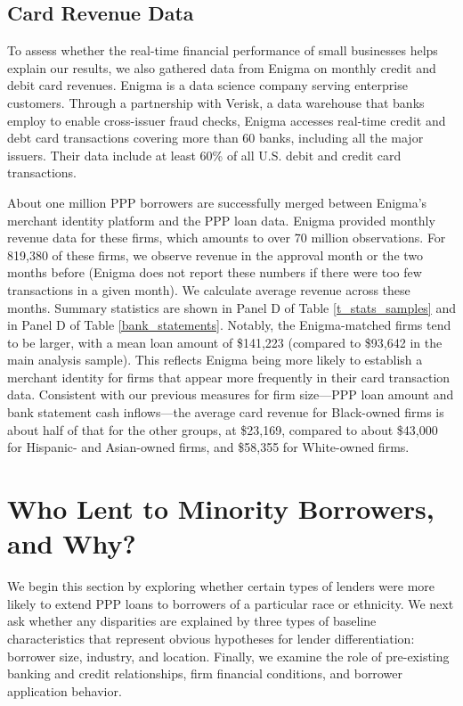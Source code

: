 \documentclass[11pt]{article}
\begin{document}
\subsection{Card Revenue Data}\label{data_card}

To assess whether the real-time financial performance of small businesses helps explain our results, we also gathered data from Enigma on monthly credit and debit card revenues. Enigma is a data science company serving enterprise customers. Through a partnership with Verisk, a data warehouse that banks employ to enable cross-issuer fraud checks, Enigma accesses real-time credit and debt card transactions covering more than 60 banks, including all the major issuers. Their data include at least 60\% of all U.S. debit and credit card transactions.

About one million PPP borrowers are successfully merged between Enigma's merchant identity platform and the PPP loan data. Enigma provided monthly revenue data for these firms, which amounts to over 70 million observations. For 819,380 of these firms, we observe revenue in the approval month or the two months before (Enigma does not report these numbers if there were too few transactions in a given month). We calculate average revenue across these months. Summary statistics are shown in  Panel D of Table \ref{t_stats_samples} and in Panel D of Table \ref{bank_statements}. Notably, the Enigma-matched firms tend to be larger, with a mean loan amount of \$141,223 (compared to \$93,642 in the main analysis sample). This reflects Enigma being more likely to establish a merchant identity for firms that appear more frequently in their card transaction data. Consistent with our previous measures for firm size---PPP loan amount and bank statement cash inflows---the average card revenue for Black-owned firms is about half of that for the other groups, at \$23,169, compared to about \$43,000 for Hispanic- and Asian-owned firms, and \$58,355 for White-owned firms.


\section{Who Lent to Minority Borrowers, and Why?}\label{analysis_first}

We begin this section by exploring whether certain types of lenders were more likely to extend PPP loans to borrowers of a particular race or ethnicity. We next ask whether any disparities are explained by three types of baseline characteristics that represent obvious hypotheses for lender differentiation: borrower size, industry, and location. Finally, we examine the role of pre-existing banking and credit relationships, firm financial conditions, and borrower application behavior. 
\end{document}
